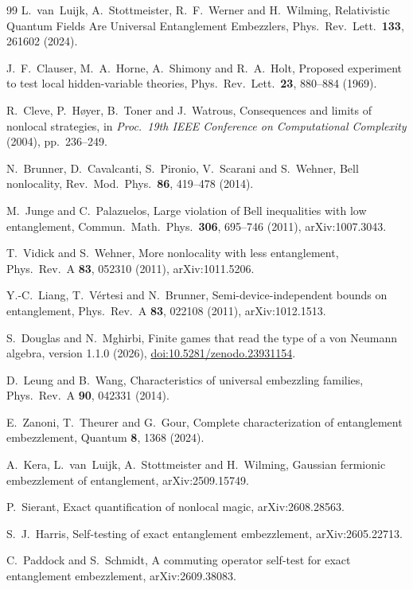 \documentclass[10pt,a4paper]{article}
\theoremstyle{remark}
\begin{document}
\begin{thebibliography}{99}
 L.~van~Luijk, A.~Stottmeister, R.~F.~Werner and H.~Wilming,
Relativistic Quantum Fields Are Universal Entanglement Embezzlers,
Phys.\ Rev.\ Lett.\ \textbf{133}, 261602 (2024).

 J.~F.~Clauser, M.~A.~Horne, A.~Shimony and R.~A.~Holt, Proposed experiment to
test local hidden-variable theories, Phys.\ Rev.\ Lett.\ \textbf{23}, 880--884 (1969).

 R.~Cleve, P.~H{\o}yer, B.~Toner and J.~Watrous, Consequences and limits of
nonlocal strategies, in \emph{Proc.\ 19th IEEE Conference on Computational Complexity} (2004),
pp.~236--249.

 N.~Brunner, D.~Cavalcanti, S.~Pironio, V.~Scarani and S.~Wehner, Bell
nonlocality, Rev.\ Mod.\ Phys.\ \textbf{86}, 419--478 (2014).

 M.~Junge and C.~Palazuelos, Large violation of Bell
inequalities with low entanglement, Commun.\ Math.\ Phys.\ \textbf{306},
695--746 (2011), arXiv:1007.3043.

 T.~Vidick and S.~Wehner, More nonlocality with less
entanglement, Phys.\ Rev.\ A \textbf{83}, 052310 (2011), \mbox{arXiv:1011.5206}.

 Y.-C.~Liang, T.~V\'ertesi and N.~Brunner,
Semi-device-independent bounds on entanglement, Phys.\ Rev.\ A
\textbf{83}, 022108 (2011), arXiv:1012.1513.

 S.~Douglas and N.~Mghirbi, Finite games that read the type of a von Neumann
algebra, version 1.1.0 (2026), \href{https://doi.org/10.5281/zenodo.23931154}{doi:10.5281/zenodo.23931154}.

 D.~Leung and B.~Wang, Characteristics of universal embezzling families,
Phys.\ Rev.\ A \textbf{90}, 042331 (2014).

 E.~Zanoni, T.~Theurer and G.~Gour, Complete characterization of entanglement
embezzlement, Quantum \textbf{8}, 1368 (2024).

 A.~Kera, L.~van~Luijk, A.~Stottmeister and H.~Wilming, Gaussian fermionic
embezzlement of entanglement, arXiv:2509.15749.

 P.~Sierant, Exact quantification of nonlocal magic, arXiv:2608.28563.

 S.~J.~Harris, Self-testing of exact entanglement embezzlement,
arXiv:2605.22713.

 C.~Paddock and S.~Schmidt, A commuting operator self-test for exact
entanglement embezzlement, arXiv:2609.38083.


\end{thebibliography}
\end{document}
